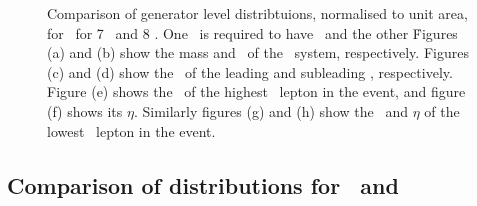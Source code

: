 \begin{figure}
{    }
        \vspace{-2mm}
        \vspace{-2mm}
    \caption{\small Comparison of generator level distribtuions, normalised to
    unit area, for \ZZsllll\ for 7
    \tev\ and 8 \tev. One \Z\ is required to have \sstooosZ\ and the other
    \mZgtt\. Figures (a)
    and (b) show the mass and \pt\ of the \ZZ\ system,
    respectively. Figures (c) and (d) show the \pt\ of the
    leading and subleading \Z, respectively. Figure (e) shows the \pt\ of the highest \pt\ lepton in the event, and figure (f) shows its
   $\eta$. Similarly figures (g) and (h) show the \pt\ and $\eta$ of the lowest
   \pt\ lepton in the event.}
    \label{fig:gen-comp-7-8-ZZs}
\end{figure}

\subsection{Comparison of distributions for \ggZZ\ and \qqZZ}

